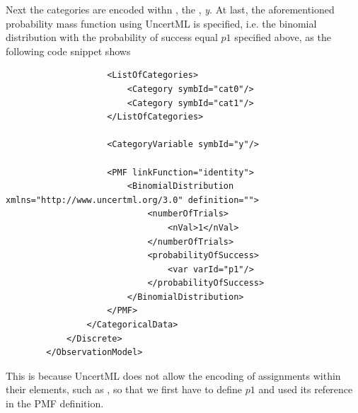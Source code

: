 Next the categories are encoded withn , the 
, \emph{y}. At last, the aforementioned probability mass function 
using UncertML is specified, i.e. the binomial distribution with the probability of success equal 
$p1$ specified above, as the following code snippet shows  
\lstset{language=XML}
\begin{lstlisting}
                    <ListOfCategories> 
                        <Category symbId="cat0"/>
                        <Category symbId="cat1"/>
                    </ListOfCategories>
                    
                    <CategoryVariable symbId="y"/>
                    
                    <PMF linkFunction="identity">
                        <BinomialDistribution xmlns="http://www.uncertml.org/3.0" definition="">
                            <numberOfTrials>
                                <nVal>1</nVal>
                            </numberOfTrials>
                            <probabilityOfSuccess>
                                <var varId="p1"/>
                            </probabilityOfSuccess>
                        </BinomialDistribution>
                    </PMF>
                </CategoricalData>
            </Discrete>
        </ObservationModel>
\end{lstlisting}
This is because UncertML does not allow the encoding of assignments within their elements, such as 
, so that we first have to define $p1$ and used its reference in the 
PMF definition.

